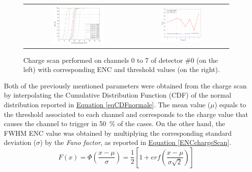 \begin{figure}[h!] %
    \centering
    \begin{tabular}{cc}
        \includegraphics[width=0.505\textwidth]{Images/chap3/results/americio/Threshold Scan - Detector 0 - TH214.pdf} & \includegraphics[width=0.44\textwidth]{Images/chap3/results/americio/ENC_channels.pdf}\\
    \end{tabular}
    \caption{Charge scan performed on channels 0 to 7 of detector \#0 (on the left) with corresponding ENC and threshold values (on the right).}
    \label{figChargeScan}
\end{figure}

\par
Both of the previously mentioned parameters were obtained from the charge scan by interpolating the Cumulative Distribution Function (CDF) of the normal distribution reported in \hyperref[eqCDFnormale]{Equation \ref{eqCDFnormale}}. The mean value ($\mu$) equals to the threshold associated to each channel and corresponds to the charge value that causes the channel to trigger in \SI{50}{\percent} of the cases. On the other hand, the FWHM ENC value was obtained by multiplying the corresponding standard deviation ($\sigma$) by the \textit{Fano factor}, as reported in \hyperref[ENCchargeScan]{Equation \ref{ENCchargeScan}}. \\

\begin{equation}
    F(x) = \Phi \left(\frac{x-\mu}{\sigma}\right) = \frac{1}{2} \left[ 1 + erf \left( \frac{x-\mu}{\sigma \sqrt{2}} \right) \right]
    \label{eqCDFnormale}
\end{equation}

